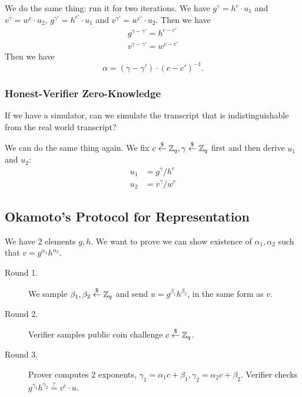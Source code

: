 We do the same thing: run it for two iterations. We have $g^\gamma = h^c\cdot u_1$ and $v^\gamma = w^c\cdot u_2$, $g^{\gamma'} = h^{c'}\cdot u_1$ and $v^{\gamma'} = w^{c'}\cdot u_2$. Then we have
\begin{align*}
    g^{\gamma-\gamma'} = h^{c-c'} \\
    v^{\gamma-\gamma'} = w^{c-c'}
\end{align*}
Then we have
\[\alpha = (\gamma - \gamma')\cdot (c - c')^{-1}.\]

\subsubsection{Honest-Verifier Zero-Knowledge}

If we have a simulator, can we simulate the transcript that is indistinguishable from the real world transcript?

We can do the same thing again. We fix $c\overset{\$}{\leftarrow} \mathbb Z_q, \gamma\overset{\$}{\leftarrow} \mathbb Z_q$ first and then derive $u_1$ and $u_2$:
\begin{align*}
    u_1 & = g^\gamma / h^c \\
    u_2 & = v^\gamma / w^c
\end{align*}

\subsection{Okamoto's Protocol for Representation}\label{sec:mar7-okamoto}
\vspace{1em}

\begin{example}
    We have 2 elements $g, h$. We want to prove we can show existence of $\alpha_1, \alpha_2$ such that $v = g^{\alpha_1}h^{\alpha_2}$.
    \begin{description}
        \item[Round 1.] We sample $\beta_1, \beta_2\overset{\$}{\leftarrow}\mathbb Z_q$ and send $u = g^{\beta_1}h^{\beta_2}$, in the same form as $v$.
        \item[Round 2.] Verifier samples public coin challenge $c\overset{\$}{\leftarrow}\mathbb Z_q$.
        \item[Round 3.] Prover computes 2 exponents, $\gamma_1 = \alpha_1 c+\beta_1, \gamma_2 = \alpha_2 c + \beta_2$. Verifier checks $g^{\gamma_1}h^{\gamma_2}\overset{?}{=}v^c\cdot u$.
    \end{description}
\end{example}


